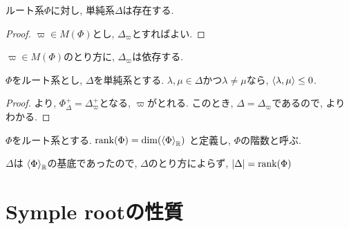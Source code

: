 \begin{cor}
  ルート系$\Phi$に対し, 単純系$\Delta$は存在する.
\end{cor}
\begin{proof}
  $\varpi\in M(\Phi)$とし, $\Delta_\varpi$とすればよい.
\end{proof}
\begin{remark}
  $\varpi\in M(\Phi)$のとり方に, $\Delta_\varpi$は依存する.
\end{remark}

\begin{theorem}
  $\Phi$をルート系とし,
  $\Delta$を単純系とする.
  $\lambda,\mu\in\Delta$かつ$\lambda\neq \mu$なら, $\Braket{\lambda,\mu}\leq 0$.
  
\end{theorem}
\begin{proof}
  より,
  $\Phi_\Delta^+=\Delta_\varpi^+$となる, $\varpi$がとれる.
  このとき, $\Delta=\Delta_\varpi$であるので,
  よりわかる.
\end{proof}



\begin{definition}
  $\Phi$をルート系とする.
  $\operatorname{rank}(\Phi)=\dim(\Braket{\Phi}_{\mathbb{R}})$
  と定義し, $\Phi$の階数と呼ぶ.
\end{definition}

\begin{remark}
  $\Delta$は
  $\Braket{\Phi}_{\mathbb{R}}$の基底であったので,
  $\Delta$のとり方によらず,
  $\left|\Delta\right|=\operatorname{rank}(\Phi)$
\end{remark}


\chapter{Symple rootの性質}
